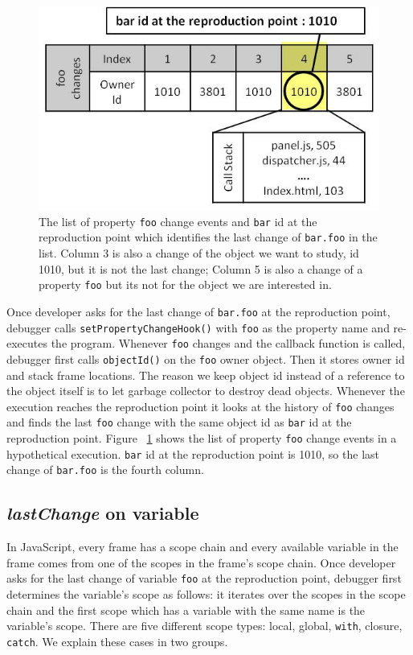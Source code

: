\documentclass[preprint]{sigplanconf}
\begin{document}
\begin{figure}[htp]
\includegraphics[width=.48\textwidth]{6-foo-changes1.jpg}
\caption{The list of property \texttt{foo} change events and \texttt{bar} id at the reproduction point which identifies the last change of \texttt{bar.foo} in the list. Column 3 is also a change of the object we want to study, id 1010, but it is not the last change; Column 5 is also a change of a property \texttt{foo} but its not for the object we are interested in.}
\label{fig:foo-changes1}
\end{figure}

Once developer asks for the last change of \texttt{bar.foo} at the reproduction point, debugger calls \texttt{setPropertyChangeHook()} with \texttt{foo} as the property name and re-executes the program. Whenever \texttt{foo} changes and the callback function is called, debugger first calls \texttt{objectId()} on the \texttt{foo} owner object. Then it stores owner id and stack frame locations. The reason we keep object id instead of a reference to the object itself is to let garbage collector to destroy dead objects. Whenever the execution reaches the reproduction point it looks at the history of \texttt{foo} changes and finds the last \texttt{foo} change with the same object id as \texttt{bar} id at the reproduction point. Figure ~\ref{fig:foo-changes1} shows the list of property \texttt{foo} change events in a hypothetical execution. \texttt{bar} id at the reproduction point is 1010, so the last change of \texttt{bar.foo} is the fourth column.

\subsection{\textit{lastChange} on variable} 
In JavaScript, every frame has a scope chain and every available variable in the frame comes from one of the scopes in the frame's scope chain. Once developer asks for the last change of variable \texttt{foo} at the reproduction point, debugger first determines the variable's scope as follows: it iterates over the scopes in the scope chain and the first scope which has a variable with the same name is the variable's scope. There are five different scope types: local, global, \texttt{with}, closure, \texttt{catch}. We explain these cases in two groups.
\end{document}

